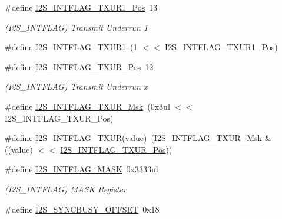 \begin{DoxyCompactItemize}
\item 
\#define \mbox{\hyperlink{group___s_a_m_d21___i2_s_ga5b34bc919a96b16a6b6cf8fcd7d1c657}{I2\+S\+\_\+\+I\+N\+T\+F\+L\+A\+G\+\_\+\+T\+X\+U\+R1\+\_\+\+Pos}}~13
\begin{DoxyCompactList}\small\item\em (I2\+S\+\_\+\+I\+N\+T\+F\+L\+AG) Transmit Underrun 1 \end{DoxyCompactList}\item 
\#define \mbox{\hyperlink{group___s_a_m_d21___i2_s_ga15ca78dcb05e3abe4af78cae1254038c}{I2\+S\+\_\+\+I\+N\+T\+F\+L\+A\+G\+\_\+\+T\+X\+U\+R1}}~(1 $<$$<$ \mbox{\hyperlink{group___s_a_m_d21___i2_s_ga5b34bc919a96b16a6b6cf8fcd7d1c657}{I2\+S\+\_\+\+I\+N\+T\+F\+L\+A\+G\+\_\+\+T\+X\+U\+R1\+\_\+\+Pos}})
\item 
\#define \mbox{\hyperlink{group___s_a_m_d21___i2_s_ga8f19374ab8dd41bf7c35c129c1389fa7}{I2\+S\+\_\+\+I\+N\+T\+F\+L\+A\+G\+\_\+\+T\+X\+U\+R\+\_\+\+Pos}}~12
\begin{DoxyCompactList}\small\item\em (I2\+S\+\_\+\+I\+N\+T\+F\+L\+AG) Transmit Underrun x \end{DoxyCompactList}\item 
\#define \mbox{\hyperlink{group___s_a_m_d21___i2_s_gabe183b50f2bd07fae8280f3eefeb724f}{I2\+S\+\_\+\+I\+N\+T\+F\+L\+A\+G\+\_\+\+T\+X\+U\+R\+\_\+\+Msk}}~(0x3ul $<$$<$ I2\+S\+\_\+\+I\+N\+T\+F\+L\+A\+G\+\_\+\+T\+X\+U\+R\+\_\+\+Pos)
\item 
\#define \mbox{\hyperlink{group___s_a_m_d21___i2_s_ga3a1f040fea02487e81c8d76054f21589}{I2\+S\+\_\+\+I\+N\+T\+F\+L\+A\+G\+\_\+\+T\+X\+UR}}(value)~(\mbox{\hyperlink{group___s_a_m_d21___i2_s_gabe183b50f2bd07fae8280f3eefeb724f}{I2\+S\+\_\+\+I\+N\+T\+F\+L\+A\+G\+\_\+\+T\+X\+U\+R\+\_\+\+Msk}} \& ((value) $<$$<$ \mbox{\hyperlink{group___s_a_m_d21___i2_s_ga8f19374ab8dd41bf7c35c129c1389fa7}{I2\+S\+\_\+\+I\+N\+T\+F\+L\+A\+G\+\_\+\+T\+X\+U\+R\+\_\+\+Pos}}))
\item 
\#define \mbox{\hyperlink{group___s_a_m_d21___i2_s_gaa253de8b7b161df5481550f7ff9d2039}{I2\+S\+\_\+\+I\+N\+T\+F\+L\+A\+G\+\_\+\+M\+A\+SK}}~0x3333ul
\begin{DoxyCompactList}\small\item\em (I2\+S\+\_\+\+I\+N\+T\+F\+L\+AG) M\+A\+SK Register \end{DoxyCompactList}\item 
\#define \mbox{\hyperlink{group___s_a_m_d21___i2_s_ga0cd04094390fbef4453649aee09aa9d4}{I2\+S\+\_\+\+S\+Y\+N\+C\+B\+U\+S\+Y\+\_\+\+O\+F\+F\+S\+ET}}~0x18
$$
\end{DoxyCompactItemize}
